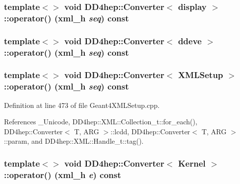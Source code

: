 \label{struct_d_d4hep_1_1_converter_aaa0f45df01957c77b7b5736c1b1c6269}
\hypertarget{struct_d_d4hep_1_1_converter_a5dca78c50fd5a859646e178bfda4528c}{
\subsubsection[{operator()}]{\setlength{\rightskip}{0pt plus 5cm}template$<$$>$ void {\bf DD4hep::Converter}$<$ display $>$::operator() ({\bf xml\_\-h} {\em seq}) const}}
\label{struct_d_d4hep_1_1_converter_a5dca78c50fd5a859646e178bfda4528c}
\hypertarget{struct_d_d4hep_1_1_converter_aecf253ac0ea173d29b412fd0d9a22656}{
\subsubsection[{operator()}]{\setlength{\rightskip}{0pt plus 5cm}template$<$$>$ void {\bf DD4hep::Converter}$<$ ddeve $>$::operator() ({\bf xml\_\-h} {\em seq}) const}}
\label{struct_d_d4hep_1_1_converter_aecf253ac0ea173d29b412fd0d9a22656}
\hypertarget{struct_d_d4hep_1_1_converter_aab0de73ce1089856aafb386be385b317}{
\subsubsection[{operator()}]{\setlength{\rightskip}{0pt plus 5cm}template$<$$>$ void {\bf DD4hep::Converter}$<$ XMLSetup $>$::operator() ({\bf xml\_\-h} {\em seq}) const}}
\label{struct_d_d4hep_1_1_converter_aab0de73ce1089856aafb386be385b317}


Definition at line 473 of file Geant4XMLSetup.cpp.

References \_\-Unicode, DD4hep::XML::Collection\_\-t::for\_\-each(), DD4hep::Converter$<$ T, ARG $>$::lcdd, DD4hep::Converter$<$ T, ARG $>$::param, and DD4hep::XML::Handle\_\-t::tag().\hypertarget{struct_d_d4hep_1_1_converter_a38a5f9d50167466d9d4ca02c3090353b}{
\subsubsection[{operator()}]{\setlength{\rightskip}{0pt plus 5cm}template$<$$>$ void {\bf DD4hep::Converter}$<$ {\bf Kernel} $>$::operator() ({\bf xml\_\-h} {\em e}) const}}
\label{struct_d_d4hep_1_1_converter_a38a5f9d50167466d9d4ca02c3090353b}


